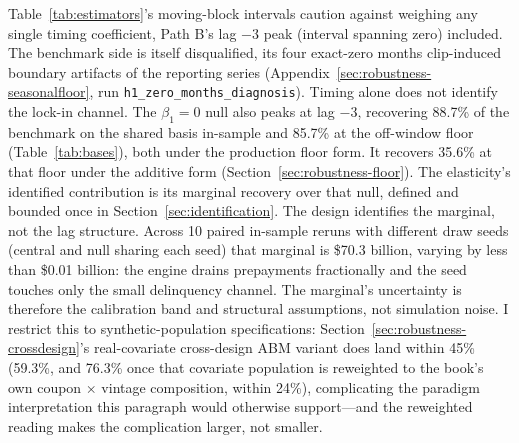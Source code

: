 \documentclass[12pt]{article}
\begin{document}
Table~\ref{tab:estimators}'s moving-block intervals caution against weighing any single timing coefficient, Path B's lag $-3$ peak (interval spanning zero) included. The benchmark side is itself disqualified, its four exact-zero months clip-induced boundary artifacts of the reporting series (Appendix~\ref{sec:robustness-seasonalfloor}, run \texttt{h1\_zero\_months\_diagnosis}). Timing alone does not identify the lock-in channel. The $\beta_1 = 0$ null also peaks at lag $-3$, recovering 88.7\% of the benchmark on the shared basis in-sample and 85.7\% at the off-window floor (Table~\ref{tab:bases}), both under the production floor form. It recovers 35.6\% at that floor under the additive form (Section~\ref{sec:robustness-floor}). The elasticity's identified contribution is its marginal recovery over that null, defined and bounded once in Section~\ref{sec:identification}. The design identifies the marginal, not the lag structure. Across 10 paired in-sample reruns with different draw seeds (central and null sharing each seed) that marginal is \$70.3 billion, varying by less than \$0.01 billion: the engine drains prepayments fractionally and the seed touches only the small delinquency channel. The marginal's uncertainty is therefore the calibration band and structural assumptions, not simulation noise. I restrict this to synthetic-population specifications: Section~\ref{sec:robustness-crossdesign}'s real-covariate cross-design ABM variant does land within 45\% (59.3\%, and 76.3\% once that covariate population is reweighted to the book's own coupon $\times$ vintage composition, within 24\%), complicating the paradigm interpretation this paragraph would otherwise support---and the reweighted reading makes the complication larger, not smaller.
\end{document}
